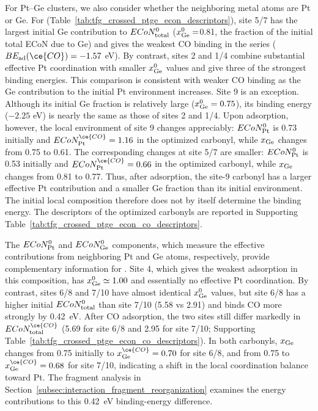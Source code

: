 For Pt--Ge clusters, we also consider whether the
neighboring metal atoms are Pt or Ge.
For  (Table~\ref{tab:tfg_crossed_ptge_econ_descriptors}),
site 5/7 has the largest initial Ge contribution to
$ECoN_{\rm total}^{0}$ ($x_{\rm Ge}^{0}=$0.81, the fraction of the initial total ECoN
due to Ge) and gives the weakest CO binding in the series
($BE_{\rm ad}(\ce{CO})=-1.57$ eV). By contrast, sites 2 and 1/4 combine substantial effective
Pt coordination with smaller $x_{\rm Ge}^{0}$ values and give three of the
strongest binding energies. This comparison is consistent with weaker CO
binding as the Ge contribution to the initial Pt environment increases.
{Site 9 is an exception. Although its initial Ge fraction is relatively
large ($x_{\rm Ge}^{0}=0.75$), its binding energy ($-2.25$ eV) is nearly the same as}
those of sites 2 and 1/4. Upon adsorption, however, the local environment of
site 9 changes appreciably: $ECoN_{\rm Pt}^{0}$ is 0.73 initially
and $ECoN_{\rm Pt}^{\ce{CO}}=1.16$ in the optimized carbonyl, while
$x_{\rm Ge}$ changes from 0.75 to 0.61. The corresponding changes at site
5/7 are smaller: $ECoN_{\rm Pt}^{0}$ is 0.53 initially and
$ECoN_{\rm Pt}^{\ce{CO}}=0.66$ in the optimized carbonyl, while
$x_{\rm Ge}$ changes from 0.81 to 0.77. Thus, after adsorption, the site-9 carbonyl
has a larger effective Pt contribution and a smaller Ge fraction than its
initial environment. The initial local composition therefore does not by
itself determine the binding energy.
The descriptors of the optimized carbonyls are reported in Supporting
Table~\ref{tab:tfg_crossed_ptge_econ_co_descriptors}.

The $ECoN_{\rm Pt}^{0}$ and $ECoN_{\rm Ge}^{0}$ components, which measure the
effective contributions from neighboring Pt and Ge atoms, respectively,
provide complementary information for .
Site 4, which gives the weakest adsorption in this composition, has
$x_{\rm Ge}^{0}\simeq1.00$ and essentially no effective Pt coordination. By
contrast, sites 6/8 and 7/10 have almost identical $x_{\rm Ge}^{0}$ values,
but site 6/8 has a higher initial $ECoN_{\rm total}^{0}$ than site 7/10
(5.58 vs 2.91) and binds CO more strongly by 0.42~eV.
After CO adsorption, the two sites still differ markedly in
$ECoN_{\rm total}^{\ce{CO}}$ (5.69 for site 6/8 and 2.95 for site 7/10;
Supporting Table~\ref{tab:tfg_crossed_ptge_econ_co_descriptors}). In both
carbonyls,
$x_{\rm Ge}$ changes from 0.75 initially to
$x_{\rm Ge}^{\ce{CO}}=0.70$ for site 6/8, and from 0.75 to
$x_{\rm Ge}^{\ce{CO}}=0.68$ for site 7/10,
indicating a shift in the local coordination balance toward Pt.
The fragment analysis in
Section~\ref{subsec:interaction_fragment_reorganization} examines the energy
contributions to this 0.42~eV binding-energy difference.

